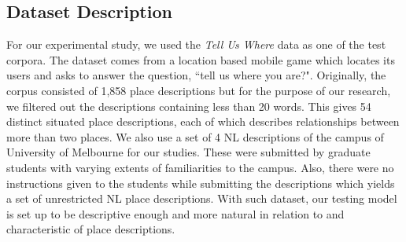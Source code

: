 \documentclass{acm_proc_article-sp}
\begin{document}
\subsection{Dataset Description}
For our experimental study, we used the \textit{Tell Us Where} data \cite{tuw} as one of the test corpora. The dataset comes from a location based mobile game which locates its users and asks to answer the question, ``tell us where you are?". Originally, the corpus consisted of 1,858 place descriptions but for the purpose of our research, we filtered out the descriptions containing less than 20 words. This gives 54 distinct situated place descriptions, each of which describes relationships between more than two places. We also use a set of 4 NL descriptions of the campus of University of Melbourne for our studies. These were submitted by graduate students with varying extents of familiarities to the campus. Also, there were no instructions given to the students while submitting the descriptions which yields a set of unrestricted NL place descriptions.
With such dataset, our testing model is set up to be descriptive enough and more natural in relation to and characteristic of place descriptions. 
\end{document}
